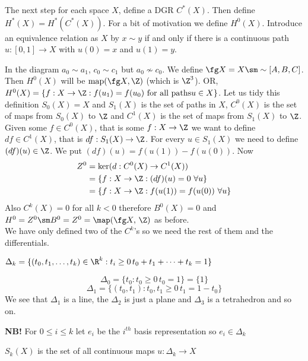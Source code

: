 The next step for each space $X$, define a DGR $C^*(X)$. Then define $H^*(X) = H^*(C^*(X))$. For a bit of motivation we define $H^0(X)$. Introduce an equivalence relation as $X$ by $x \sim y$ if and only if there is a continuous path $u : [0, 1] \to X$ with $u(0) = x$ and $u(1) = y$.

In the diagram $a_0 \sim a_1$, $c_0 \sim c_1$ but $a_0 \not\sim c_0$. We define $\fg X = X \sm \sim [A, B, C]$. Then $H^0(X)$ will be $\text{map}(\fg X, \Z)$ (which is $\Z^3$). OR, $H^0(X) = \{f : X \to \Z : f(u_1) = f(u_0) \text{ for all paths} u \in X\}$.
Let us tidy this definition $S_0(X) = X$ and $S_1(X)$ is the set of paths in $X$, $C^0(X)$ is the set of maps from $S_0(X)$ to $\Z$ and $C^1(X)$ is the set of maps from $S_1(X)$ to $\Z$. Given some $f \in C^0(X)$, that is some $f : X \to \Z$ we want to define $df \in C^1(X)$, that is $df : S_1(X) \to \Z$. For every $u \in S_1(X)$ we need to define $(df)(u) \in \Z$. We put $(df)(u) = f(u(1)) - f(u(0))$.
Now
\begin{align*}
  Z^0 &= \ker (d : C^0(X) \to C^1(X))\\
  &= \{f : X \to \Z : (df)(u) = 0 \,\,\forall u\} \\
  &= \{f : X \to \Z : f(u(1)) = f(u(0)) \,\,\forall u\}
\end{align*}
Also $C^k(X) = 0$ for all $k < 0$ therefore $B^0(X) = 0$ and $H^0 = Z^0\sm B^0 = Z^0 = \map (\fg X,\, \Z)$ as before.\\

\noindent
We have only defined two of the $C^k$'s so we need the rest of them and the differentials.
\begin{ndefi}
  $\Delta_k = \{(t_0, t_1, \dots, t_k) \in \R^k : t_i \ge 0 \, t_0 + t_1 + \dots + t_k = 1\}$
\end{ndefi}

\begin{eg}
  $$ \Delta_0 = \{t_0 : t_0 \ge 0 \, t_0 = 1\} = \{1\} $$
  $$ \Delta_1 = \{ (t_0, t_1) : t_0, t_1 \ge 0 \, t_1 = 1 - t_0 \} $$
  We see that $\Delta_1$ is a line, the $\Delta_2$ is just a plane and $\Delta_3$ is a tetrahedron and so on.
\end{eg}

\textbf{NB!} For $0 \le i \le k$ let $e_i$ be the $i^{th}$ basis representation so $e_i \in \Delta_k$

\begin{ndefi}
  $S_k(X)$ is the set of all continuous maps $u : \Delta_k \to X$
\end{ndefi}

